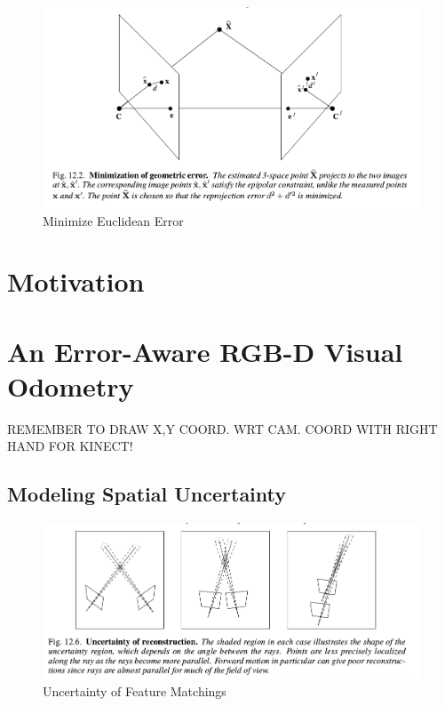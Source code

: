 \documentclass[a4paper]{report}
\numberwithin{figure}{section}
\begin{document}
\begin{figure}[H]
	\centering
  \includegraphics[width=0.7\linewidth,natwidth=640,natheight=640]
  {fig/ref_imgs/min_euclidean_error.png}
  \caption{Minimize Euclidean Error}
	\label{fig:min_euclidean_error}
\end{figure}


\chapter{Motivation} \label{cp_motivation}

\chapter{An Error-Aware RGB-D Visual Odometry} \label{cp_covo}

REMEMBER TO DRAW X,Y COORD. WRT CAM. COORD WITH RIGHT HAND FOR KINECT!

\section{Modeling Spatial Uncertainty} \label{sc_spatial_uncertainty}

\begin{figure}[H]
	\centering
  \includegraphics[width=0.7\linewidth,natwidth=640,natheight=640]
  {fig/ref_imgs/uncertainty_matching.png}
  \caption{Uncertainty of Feature Matchings}
	\label{fig:uncertainty_matching}
\end{figure}
\end{document}
